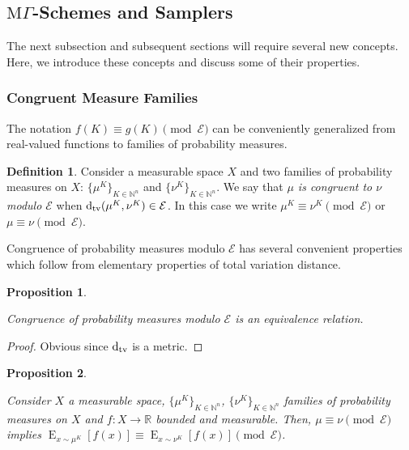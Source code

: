 \documentclass{article}
\numberwithin{equation}{section}
\theoremstyle{definition}
\newtheorem{definition}{Definition}[section]
\theoremstyle{plain}
\newtheorem{proposition}{Proposition}[section]
\DeclareMathOperator{\E}{E}
\newcommand{\Dtv}{\operatorname{d}_{\textnormal{tv}}}
\newcommand{\Nats}{\mathbb{N}}
\newcommand{\Reals}{\mathbb{R}}
\newcommand{\MGrow}{\mathrm{M}\Gamma}
\newcommand{\Fall}{\mathcal{E}}
\begin{document}
\subsection{\texorpdfstring{$\MGrow$}{MΓ}-Schemes and Samplers}

The next subsection and subsequent sections will require several new concepts. Here, we introduce these concepts and discuss some of their properties.

\subsubsection{Congruent Measure Families}

The notation $f(K) \equiv g(K) \pmod \Fall$ can be conveniently generalized from real-valued functions to families of probability measures.

\begin{samepage}
\begin{definition}

Consider a measurable space $X$ and two families of probability measures on $X$: $\{\mu^K\}_{K \in \Nats^n}$ and $\{\nu^K\}_{K \in \Nats^n}$. We say that \emph{$\mu$ is congruent to $\nu$ modulo $\Fall$} when $\Dtv(\mu^K,\nu^K) \in \Fall$. In this case we write $\mu^K \equiv \nu^K \pmod \Fall$ or $\mu \equiv \nu \pmod \Fall$.

\end{definition}
\end{samepage}

Congruence of probability measures modulo $\Fall$ has several convenient properties which follow from elementary properties of total variation distance.

\begin{samepage}
\begin{proposition}
\label{prp:prob_cong_eq}

Congruence of probability measures modulo $\Fall$ is an equivalence relation.

\end{proposition}
\end{samepage}

\begin{proof}

Obvious since $\Dtv$ is a metric.
\end{proof}

\begin{samepage}
\begin{proposition}
\label{prp:prob_cong_ev}

Consider $X$ a measurable space, $\{\mu^K\}_{K \in \Nats^n}$, $\{\nu^K\}_{K \in \Nats^n}$ families of probability measures on $X$ and $f: X \rightarrow \Reals$ bounded and measurable. Then, $\mu \equiv \nu \pmod \Fall$ implies $\E_{x \sim \mu^K}[f(x)] \equiv \E_{x \sim \nu^K}[f(x)] \pmod \Fall$.

\end{proposition}
\end{samepage}
\end{document}
